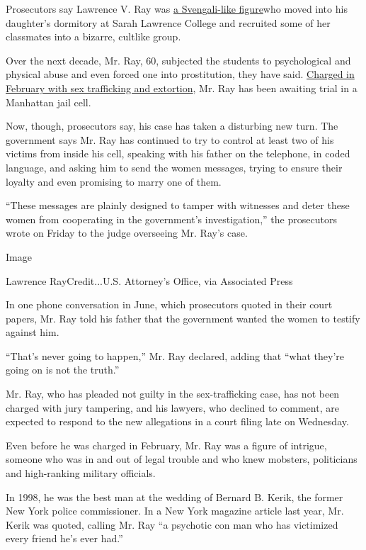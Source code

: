 Prosecutors say Lawrence V. Ray was
\href{https://www.nytimes3xbfgragh.onion/2020/02/12/nyregion/larry-ray-sarah-lawrence.html?searchResultPosition=3}{a
Svengali-like figure}who moved into his daughter's dormitory at Sarah
Lawrence College and recruited some of her classmates into a bizarre,
cultlike group.

Over the next decade, Mr. Ray, 60, subjected the students to
psychological and physical abuse and even forced one into prostitution,
they have said.
\href{https://www.nytimes3xbfgragh.onion/2020/02/11/nyregion/larry-ray-sarah-lawrence-sex.html?searchResultPosition=1}{Charged
in February with sex trafficking and extortion}, Mr. Ray has been
awaiting trial in a Manhattan jail cell.

Now, though, prosecutors say, his case has taken a disturbing new turn.
The government says Mr. Ray has continued to try to control at least two
of his victims from inside his cell, speaking with his father on the
telephone, in coded language, and asking him to send the women messages,
trying to ensure their loyalty and even promising to marry one of them.

``These messages are plainly designed to tamper with witnesses and deter
these women from cooperating in the government's investigation,'' the
prosecutors wrote on Friday to the judge overseeing Mr. Ray's case.

Image

Lawrence RayCredit...U.S. Attorney's Office, via Associated Press

In one phone conversation in June, which prosecutors quoted in their
court papers, Mr. Ray told his father that the government wanted the
women to testify against him.

``That's never going to happen,'' Mr. Ray declared, adding that ``what
they're going on is not the truth.''

Mr. Ray, who has pleaded not guilty in the sex-trafficking case, has not
been charged with jury tampering, and his lawyers, who declined to
comment, are expected to respond to the new allegations in a court
filing late on Wednesday.

Even before he was charged in February, Mr. Ray was a figure of
intrigue, someone who was in and out of legal trouble and who knew
mobsters, politicians and high-ranking military officials.

In 1998, he was the best man at the wedding of Bernard B. Kerik, the
former New York police commissioner. In a New York magazine article last
year, Mr. Kerik was quoted, calling Mr. Ray ``a psychotic con man who
has victimized every friend he's ever had.''

